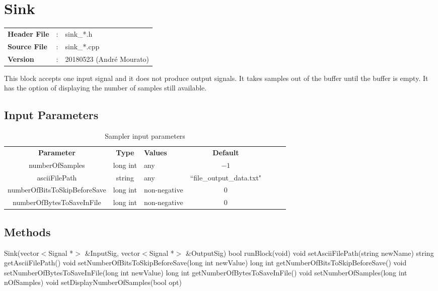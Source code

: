 \clearpage

\section{Sink}

\begin{tcolorbox}	
	\begin{tabular}{p{2.75cm} p{0.2cm} p{10.5cm}} 	
		\textbf{Header File}   &:& sink\_*.h \\
		\textbf{Source File}   &:& sink\_*.cpp \\
        \textbf{Version}       &:& 20180523 (Andr\'e Mourato)
	\end{tabular}
\end{tcolorbox}

This block accepts one input signal and it does not produce output signals. It takes samples out of the buffer until the buffer is empty. It has the option of displaying the number of samples still available.

\subsection*{Input Parameters}

\begin{table}[h]
	\centering
	\begin{tabular}{|c|c|p{30mm}|c|ccp{60mm}}
		\cline{1-4}
		\textbf{Parameter} & \textbf{Type} & \textbf{Values} &   \textbf{Default}& \\ \cline{1-4}
		numberOfSamples & long int & any & $-1$ \\ \cline{1-4}
        asciiFilePath & string & any & ``file\_output\_data.txt" \\ \cline{1-4}
        numberOfBitsToSkipBeforeSave & long int & non-negative & $0$ \\ \cline{1-4}
        numberOfBytesToSaveInFile & long int & non-negative & $0$ \\ \cline{1-4}
	\end{tabular}
	\caption{Sampler input parameters}
	\label{table:sink_in_par}
\end{table}

\subsection*{Methods}

Sink(vector$<$Signal *$>$ \&InputSig, vector$<$Signal *$>$ \&OutputSig)
\bigbreak
bool runBlock(void)
\bigbreak
void setAsciiFilePath(string newName)
\bigbreak
string getAsciiFilePath()
\bigbreak
void setNumberOfBitsToSkipBeforeSave(long int newValue)
\bigbreak
long int getNumberOfBitsToSkipBeforeSave()
\bigbreak
void setNumberOfBytesToSaveInFile(long int newValue)
\bigbreak
long int getNumberOfBytesToSaveInFile()
\bigbreak
void setNumberOfSamples(long int nOfSamples)
\bigbreak
void setDisplayNumberOfSamples(bool opt)

